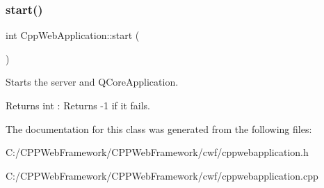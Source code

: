 \subsubsection{\texorpdfstring{start()}{start()}}
{\footnotesize\ttfamily int Cpp\+Web\+Application\+::start (\begin{DoxyParamCaption}{ }\end{DoxyParamCaption})}



Starts the server and Q\+Core\+Application. 

\begin{DoxyReturn}{Returns}
int \+: Returns -\/1 if it fails. 
\end{DoxyReturn}


The documentation for this class was generated from the following files\+:\begin{DoxyCompactItemize}
\item 
C\+:/\+C\+P\+P\+Web\+Framework/\+C\+P\+P\+Web\+Framework/cwf/cppwebapplication.\+h\item 
C\+:/\+C\+P\+P\+Web\+Framework/\+C\+P\+P\+Web\+Framework/cwf/cppwebapplication.\+cpp\end{DoxyCompactItemize}
